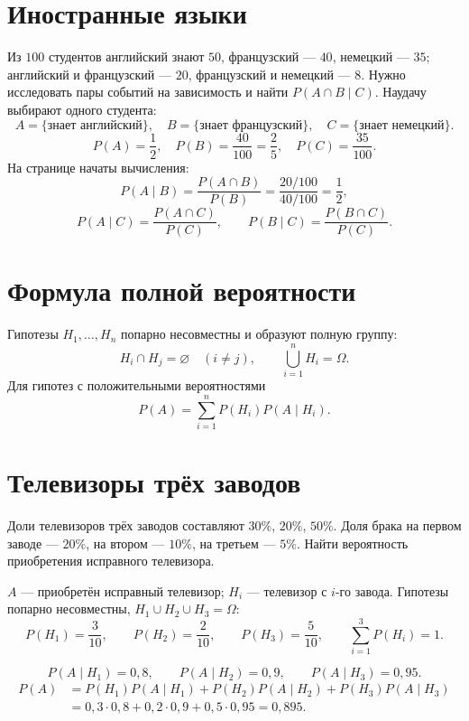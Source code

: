 \section*{Иностранные языки}
Из $100$ студентов английский знают $50$, французский --- $40$,
немецкий --- $35$; английский и французский --- $20$,
французский и немецкий --- $8$.
Нужно исследовать пары событий на зависимость и найти $P(A\cap B\mid C)$.
Наудачу выбирают одного студента:
\[
 A=\{\text{знает английский}\},\quad
 B=\{\text{знает французский}\},\quad C=\{\text{знает немецкий}\}.
\]
\[
 P(A)=\frac12,\quad P(B)=\frac{40}{100}=\frac25,\quad
 P(C)=\frac{35}{100}.
\]
На странице начаты вычисления:
\[
 P(A\mid B)=\frac{P(A\cap B)}{P(B)}
 =\frac{20/100}{40/100}=\frac12,
\]
\[
 P(A\mid C)=\frac{P(A\cap C)}{P(C)},\qquad
 P(B\mid C)=\frac{P(B\cap C)}{P(C)}.
\]

\section*{Формула полной вероятности}
Гипотезы $H_1,\ldots,H_n$ попарно несовместны и образуют полную группу:
\[
 H_i\cap H_j=\varnothing\quad(i\ne j),\qquad
 \bigcup_{i=1}^n H_i=\Omega.
\]
Для гипотез с положительными вероятностями
\[
 \boxed{P(A)=\sum_{i=1}^n P(H_i)P(A\mid H_i).}
\]

\section*{Телевизоры трёх заводов}
Доли телевизоров трёх заводов составляют $30\%$, $20\%$, $50\%$.
Доля брака на первом заводе --- $20\%$, на втором --- $10\%$,
на третьем --- $5\%$. Найти вероятность приобретения исправного телевизора.

$A$ --- приобретён исправный телевизор;
$H_i$ --- телевизор с $i$-го завода. Гипотезы попарно несовместны,
$H_1\cup H_2\cup H_3=\Omega$:
\[
 P(H_1)=\frac3{10},\qquad P(H_2)=\frac2{10},\qquad P(H_3)=\frac5{10},
 \qquad \sum_{i=1}^3P(H_i)=1.
\]

\[
 P(A\mid H_1)=0{,}8,\qquad P(A\mid H_2)=0{,}9,\qquad
 P(A\mid H_3)=0{,}95.
\]
\begin{align*}
 P(A)&=P(H_1)P(A\mid H_1)+P(H_2)P(A\mid H_2)+P(H_3)P(A\mid H_3)\\
 &=0{,}3\cdot0{,}8+0{,}2\cdot0{,}9+0{,}5\cdot0{,}95=0{,}895.
\end{align*}

